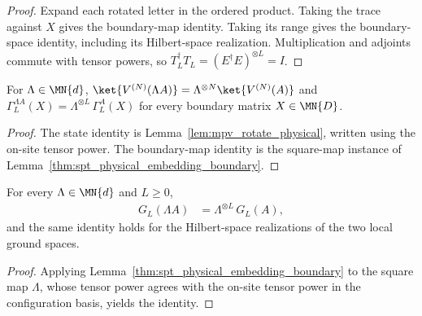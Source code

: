 \begin{proof}\leanok
    Expand each rotated letter in the ordered product. Taking the trace
    against $X$ gives the boundary-map identity. Taking its range gives
    the boundary-space identity, including its Hilbert-space realization.
    Multiplication and adjoints commute with tensor powers, so
    $T_L^\dagger T_L=(E^\dagger E)^{\otimes L}=I$.
\end{proof}

\begin{lemma}\label{lem:physical_rotation_state}
    \leanok
    For $\Lambda\in\MN{d}$,
    $\ket{V^{(N)}(\Lambda A)}=\Lambda^{\otimes N}\ket{V^{(N)}(A)}$ and
    $\Gamma_L^{\Lambda A}(X)=\Lambda^{\otimes L}\,\Gamma_L^{A}(X)$ for every
    boundary matrix $X\in\MN{D}$.
\end{lemma}

\begin{proof}\leanok
    The state identity is Lemma~\ref{lem:mpv_rotate_physical}, written using
    the on-site tensor power.
    The boundary-map identity is the square-map instance of
    Lemma~\ref{thm:spt_physical_embedding_boundary}.
\end{proof}

\begin{lemma}\label{thm:ground_space_physical_rotation}
    \leanok
    For every $\Lambda\in\MN{d}$ and $L\ge0$,
    \begin{align}
        G_L(\Lambda A) & =\Lambda^{\otimes L}\,G_L(A),
        \label{eq:ground_space_physical_rotation}
    \end{align}
    and the same identity holds for the Hilbert-space realizations of the two
    local ground spaces.
\end{lemma}

\begin{proof}
    \leanok
    Applying Lemma~\ref{thm:spt_physical_embedding_boundary} to the square map
    $\Lambda$, whose tensor power agrees with the on-site tensor power in the
    configuration basis, yields the identity.
\end{proof}


